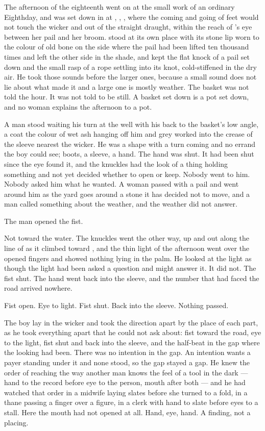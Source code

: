 The afternoon of the eighteenth went on at the small work of an ordinary Eighthday, and  was set down in  at , , , where the coming and going of feet would not touch the wicker and out of the straight draught, within the reach of 's eye between her pail and her broom.  stood at its own place with its stone lip worn to the colour of old bone on the side where the pail had been lifted ten thousand times and left the other side in the shade, and  kept the flat knock of a pail set down and the small rasp of a rope settling into its knot, cold-stiffened in the dry air. He took those sounds before the larger ones, because a small sound does not lie about what made it and a large one is mostly weather. The basket was not told the hour. It was not told to be still. A basket set down is a pot set down, and no woman explains the afternoon to a pot.

A man stood waiting his turn at the well with his back to the basket's low angle, a coat the colour of wet ash hanging off him and  grey worked into the crease of the sleeve nearest the wicker. He was a shape with a turn coming and no errand the boy could see; boots, a sleeve, a hand. The hand was shut. It had been shut since the eye found it, and the knuckles had the look of a thing holding something and not yet decided whether to open or keep. Nobody went to him. Nobody asked him what he wanted. A woman passed with a pail and went around him as the yard goes around a stone it has decided not to move, and a man called something about the weather, and the weather did not answer.

The man opened the fist.

Not toward the water. The knuckles went the other way, up and out along the line of  as it climbed toward , and the thin light of the afternoon went over the opened fingers and showed nothing lying in the palm. He looked at the light as though the light had been asked a question and might answer it. It did not. The fist shut. The hand went back into the sleeve, and the number that had faced the road arrived nowhere.

Fist open. Eye to light. Fist shut. Back into the sleeve. Nothing passed.

The boy lay in the wicker and took the direction apart by the place of each part, as he took everything apart that he could not ask about: fist toward the road, eye to the light, fist shut and back into the sleeve, and the half-beat in the gap where the looking had been. There was no intention in the gap. An intention wants a payer standing under it and none stood, so the gap stayed a gap. He knew the order of reaching the way another man knows the feel of a tool in the dark --- hand to the record before eye to the person, mouth after both --- and he had watched that order in a midwife laying slates before she turned to a fold, in a thane passing a finger over a figure, in a clerk with hand to slate before eyes to a stall. Here the mouth had not opened at all. Hand, eye, hand. A finding, not a placing.

